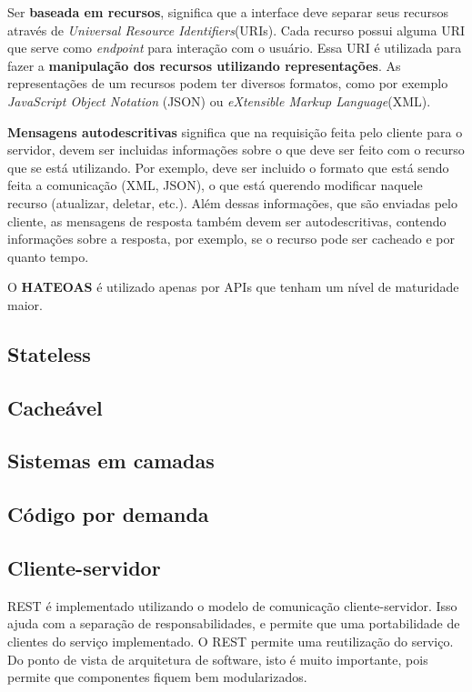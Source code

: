Ser \textbf{baseada em recursos}, significa que a interface deve separar seus
recursos através de \textit{Universal Resource Identifiers}(URIs). 
Cada recurso possui alguma URI que serve como \textit{endpoint} para interação com o usuário. 
Essa URI é utilizada para fazer a \textbf{manipulação dos recursos utilizando representações}.
As representações de um recursos podem ter diversos formatos, como por exemplo 
\textit{JavaScript Object Notation} (JSON) ou \textit{eXtensible Markup Language}(XML).

\textbf{Mensagens autodescritivas} significa que na requisição feita pelo cliente para
o servidor, devem ser incluidas informações sobre o que deve ser feito com o recurso
que se está utilizando. Por exemplo, deve ser incluido o formato que está sendo feita a
comunicação (XML, JSON), o que está querendo modificar naquele recurso (atualizar, deletar, etc.).
Além dessas informações, que são enviadas pelo cliente, as mensagens de resposta também devem 
ser autodescritivas, contendo informações sobre a resposta, por exemplo, se o recurso pode ser
cacheado e por quanto tempo.

O \textbf{HATEOAS} é utilizado apenas por APIs que tenham um nível de maturidade 
maior. 


\subsection{Stateless}
\subsection{Cacheável}
\subsection{Sistemas em camadas}
\subsection{Código por demanda}
\subsection{Cliente-servidor}

REST é implementado utilizando o modelo de comunicação cliente-servidor. 
Isso ajuda com a separação de responsabilidades, e permite que uma portabilidade 
de clientes do serviço implementado. O REST permite uma reutilização do serviço. 
Do ponto de vista de arquitetura de software, isto é muito importante, pois permite 
que componentes fiquem bem modularizados.

